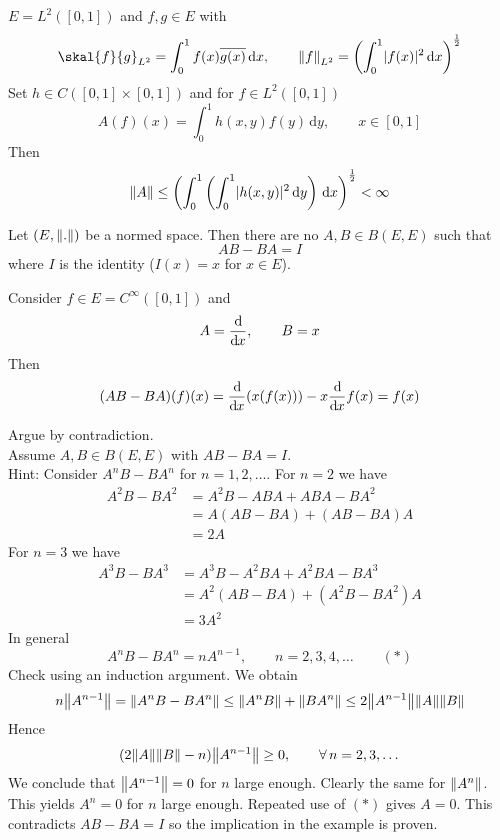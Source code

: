
\begin{beispiel}
	$E = L^2([0,1])$ and $f,g \in E$ with
	\[
		\skal{f}{g}_{L^2} = \int_{0}^{1} f(x) \overline{g(x)} \,\mathrm{d}x, \qquad \norm{f}_{L^2} = \left( \int_{0}^{1} \abs{f(x)}^2 \,\mathrm{d}x \right)^{\frac{1}{2}}
	\]
	Set $h \in C([0,1] \times [0,1])$ and for $f \in L^2([0,1])$
	\[
		A(f)(x) = \int_{0}^{1} h(x,y)f(y) \,\mathrm{d}y, \qquad x \in [0,1]
	\]
	Then
	\[
		\norm{A} \leq \left( \int_{0}^{1} \left( \int_{0}^{1} \abs{h(x,y)}^2 \,\mathrm{d}y \right) \,\mathrm{d}x \right)^{\frac{1}{2}} < \infty
	\]
\end{beispiel}
\begin{beispiel}
	Let $(E, \norm{.})$ be a normed space. Then there are no $A,B \in B(E,E)$ such that
	\[
		AB - BA = I
	\]
	where $I$ is the identity ($I(x)=x$ for $x \in E$).
	\begin{bemerkung}
		Consider $ f \in E = C^{\infty}([0,1])$ and 
		\[
			A = \frac{\mathrm{d}\mkern-1.0mu }{\mathrm{d}\mkern-1.0mu x} , \qquad B=x
		\]Then
		\[
			(AB - BA)(f)(x) = \frac{\mathrm{d}\mkern-1.0mu }{\mathrm{d}\mkern-1.0mu x} (x(f(x))) - x \frac{\mathrm{d}\mkern-1.0mu }{\mathrm{d}\mkern-1.0mu x} f(x) = f(x) 
		\]
	\end{bemerkung}
	Argue by contradiction. \\
	Assume $A,B \in B(E,E)$ with $AB-BA = I$. \\
	Hint: Consider $A^nB-BA^n$ for $n = 1,2,\dots$. For $n =2$ we have
	\begin{align*}
		A^2B-BA^2 &= A^2B-ABA + ABA - BA^2 \\
		&= A(AB-BA) + (AB-BA)A \\
		&= 2A
	\end{align*}
	For $n=3$ we have
	\begin{align*}
		A^3B-BA^3 &= A^3B-A^2BA + A^2BA - BA^3 \\
		&=A^2(AB-BA) + (A^2B-BA^2)A \\
		&= 3A^2
	\end{align*}
	In general 
	\[
		A^nB-BA^n = nA^{n-1}, \qquad n=2,3,4,\dots \qquad (*)
	\]
	Check using an induction argument. We obtain
	\[
		n \norm{A^{n-1}} = \norm{A^nB-BA^n} \leq \norm{A^nB} + \norm{BA^n} \leq  2 \norm{A^{n-1}} \norm{A} \norm{B}
	\]
	Hence \[
		(2 \norm{A} \norm{B} -n) \norm{A^{n-1}} \geq 0, \qquad  \forall\,  n = 2,3,\dots
	\]
	We conclude that $\norm{A^{n-1}}= 0$ for $n$ large enough. Clearly the same for $\norm{A^n}$. This yields $A^n=0$ for $n$ large enough. Repeated use of $(*)$ gives $A=0$. This contradicts $AB-BA= I$ so the implication in the example is proven.
\end{beispiel}

